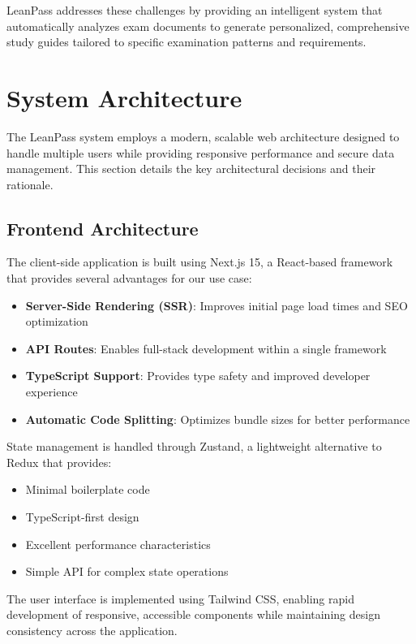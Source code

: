 \documentclass[conference]{IEEEtran}
\begin{document}
LeanPass addresses these challenges by providing an intelligent system that automatically analyzes exam documents to generate personalized, comprehensive study guides tailored to specific examination patterns and requirements.

\section{System Architecture}

The LeanPass system employs a modern, scalable web architecture designed to handle multiple users while providing responsive performance and secure data management. This section details the key architectural decisions and their rationale.

\subsection{Frontend Architecture}

The client-side application is built using Next.js 15, a React-based framework that provides several advantages for our use case:

\begin{itemize}
\item \textbf{Server-Side Rendering (SSR)}: Improves initial page load times and SEO optimization
\item \textbf{API Routes}: Enables full-stack development within a single framework
\item \textbf{TypeScript Support}: Provides type safety and improved developer experience
\item \textbf{Automatic Code Splitting}: Optimizes bundle sizes for better performance
\end{itemize}

State management is handled through Zustand, a lightweight alternative to Redux that provides:
\begin{itemize}
\item Minimal boilerplate code
\item TypeScript-first design
\item Excellent performance characteristics
\item Simple API for complex state operations
\end{itemize}

The user interface is implemented using Tailwind CSS, enabling rapid development of responsive, accessible components while maintaining design consistency across the application.
\end{document}
